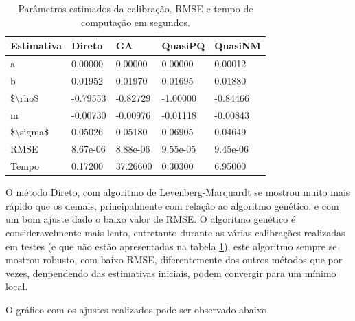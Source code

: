 \documentclass[]{book}
\theoremstyle{definition}
\theoremstyle{definition}
\theoremstyle{definition}
\theoremstyle{remark}
\begin{document}
\begin{table}[t]

\caption{\label{tab:tabela}Parâmetros estimados da calibração, RMSE e tempo de computação em segundos.}
\centering
\fontsize{18}{20}\selectfont
\begin{tabular}{lllll}
\toprule
Estimativa & Direto & GA & QuasiPQ & QuasiNM\\
\midrule
a & 0.00000 & 0.00000 & 0.00000 & 0.00012\\
b & 0.01952 & 0.01970 & 0.01695 & 0.01880\\
\$\textbackslash{}rho\$ & -0.79553 & -0.82729 & -1.00000 & -0.84466\\
m & -0.00730 & -0.00976 & -0.01118 & -0.00843\\
\$\textbackslash{}sigma\$ & 0.05026 & 0.05180 & 0.06905 & 0.04649\\
\addlinespace
RMSE & 8.67e-06 & 8.88e-06 & 9.55e-05 & 9.45e-06\\
Tempo & 0.17200 & 37.26600 & 0.30300 & 6.95000\\
\bottomrule
\end{tabular}
\end{table}

O método Direto, com algoritmo de Levenberg-Marquardt se mostrou muito mais rápido que os demais, principalmente com relação ao algoritmo genético, e com um bom ajuste dado o baixo valor de RMSE. O algoritmo genético é consideravelmente mais lento, entretanto durante as várias calibrações realizadas em testes (e que não estão apresentadas na tabela \ref{tab:tabela}), este algoritmo sempre se mostrou robusto, com baixo RMSE, diferentemente dos outros métodos que por vezes, denpendendo das estimativas iniciais, podem convergir para um mínimo local.

O gráfico com os ajustes realizados pode ser observado abaixo.
\end{document}
